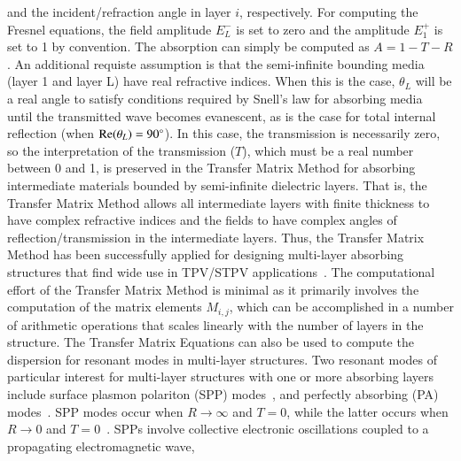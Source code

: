 \documentclass[review]{elsarticle}
\begin{document}
and the incident/refraction angle in layer $i$, respectively.  For computing the Fresnel equations, 
the field amplitude $E_L^-$ is set to zero and the amplitude $E_1^+$ is set to 1 by convention.   
The absorption can simply be computed as $A= 1-T-R$.  An additional requiste assumption is that the semi-infinite bounding 
media (layer 1 and layer L) have real refractive indices.  When this is the case, $\theta_L$ will be a real angle to satisfy conditions
required by Snell's law for absorbing media~\cite{FMS_ACSPhoton_2014,CWH_JQSRT_2005} until the transmitted wave becomes evanescent, as is the case for total internal reflection
(when ${\rm Re}(\theta_L)=90^{\circ}$).  In this case, the transmission is necessarily zero, so the interpretation of the transmission ($T$), which must be a real number between 0 and 1, is preserved in the Transfer Matrix Method for absorbing intermediate materials bounded by semi-infinite dielectric layers.   That is, the Transfer Matrix Method allows all 
intermediate layers with finite thickness to have complex refractive indices and the fields to have complex angles of reflection/transmission 
in the intermediate layers.  Thus, the Transfer Matrix Method has been successfully applied for designing multi-layer absorbing structures that find wide use in TPV/STPV applications~\cite{BN_JApplPhys_2005,LZ_JApplPhys_2006,FUS_OptExp_2015}.
The computational effort of the Transfer Matrix Method is minimal as it primarily involves the computation of the matrix elements $M_{i,j}$, which can 
be accomplished in a number of arithmetic operations that scales linearly with the number of layers in the structure.
The Transfer Matrix Equations can also be used to compute the dispersion for resonant modes in multi-layer structures.  Two
resonant modes of particular interest for multi-layer structures with one or more absorbing layers include surface plasmon polariton 
(SPP) modes~\cite{WH_PSSb_1987,Maier,Novotny,AP_NatMat_2010,FHR_SciRep_2015}, 
and perfectly absorbing (PA) modes~\cite{DD_APL_2009,KSL_APL_2012,
KBG_NatMat_2013,FHR_SciRep_2015}.  SPP modes occur 
when $R \rightarrow \infty$ and   $T=0$, while the 
latter occurs
when $R \rightarrow 0$ and   $T=0$~\cite{FHR_SciRep_2015}.  SPPs involve collective electronic oscillations coupled to a propagating electromagnetic wave,
\end{document}

